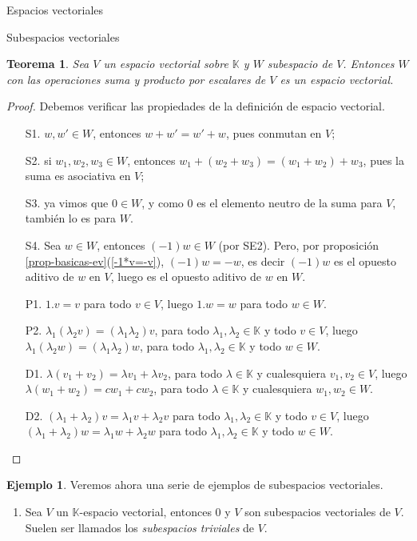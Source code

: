 \documentclass[a4paper,12pt,twoside,spanish,reqno]{amsbook}
\newtheorem{teorema}{Teorema}[section]
\theoremstyle{definition}
\newtheorem{ejemplo}{Ejemplo}[section]
\theoremstyle{remark}
\newcommand{\K}{\mathbb K}
\begin{document}
\begin{chapter}{Espacios vectoriales}
\begin{section}{Subespacios vectoriales}
	\begin{teorema}
		Sea $V$ un espacio vectorial sobre $\K$ y $W$ subespacio de $V$. Entonces $W$ con las operaciones suma y producto por escalares de $V$ es un espacio vectorial.
	\end{teorema}
	\begin{proof} Debemos verificar las propiedades de la definición de espacio vectorial.
		\begin{enumerate}
			\item[S1.] $w,w' \in W$, entonces $w + w' = w' + w$, pues conmutan en $V$;
			\item[S2.] si $w_1,w_2,w_3 \in W$, entonces $w_1+(w_2+w_3) = (w_1+w_2)+w_3$, pues la suma es asociativa en $V$;
			\item[S3.] ya vimos que $0 \in W$, y como $0$ es el elemento neutro de la suma para $V$, también lo es para $W$.
			\item[S4.] Sea $w \in W$, entonces $(-1)w \in W$ (por SE2). Pero, por proposición \ref{prop-basicas-ev}(\ref{-1*v=-v}), $(-1)w=-w$,  es decir $(-1)w$ es el opuesto aditivo de $w$  en $V$, luego es el opuesto aditivo de $w$ en $W$.
			\item[P1.] $1.v=v$ para todo $v \in V$, luego $1.w =w$ para todo $w \in W$.
			\item[P2.] $\lambda_1(\lambda_2v) = (\lambda_1\lambda_2)v$, para todo $\lambda_1,\lambda_2 \in \K$ y todo $v \in V$, luego $\lambda_1(\lambda_2w) = (\lambda_1\lambda_2)w$, para todo $\lambda_1,\lambda_2 \in \K$ y todo $w \in W$.
			\item[D1.] $\lambda(v_1+v_2) = \lambda v_1 +\lambda v_2$, para todo $\lambda \in \K$ y cualesquiera $v_1,v_2 \in V$, luego   $\lambda(w_1+w_2) = cw_1 +cw_2$, para todo $\lambda \in \K$ y cualesquiera $w_1,w_2 \in W$.
			\item[D2.] $(\lambda_1+\lambda_2)v = \lambda_1v + \lambda_2 v$ para todo $\lambda_1,\lambda_2 \in \K$ y todo $v \in V$, luego $(\lambda_1+\lambda_2)w = \lambda_1w + \lambda_2 w$ para todo $\lambda_1,\lambda_2 \in \K$ y todo $w \in W$.
		\end{enumerate} 
	\end{proof}



\begin{ejemplo} Veremos ahora una serie de ejemplos de subespacios vectoriales.
	\begin{enumerate}
		\item Sea $V$ un $\K$-espacio vectorial, entonces $0$ y $V$ son subespacios vectoriales de $V$. Suelen ser llamados los \textit{subespacios triviales} de $V$.
		

\end{enumerate}
\end{ejemplo}
\end{section}
\end{chapter}
\end{document}
